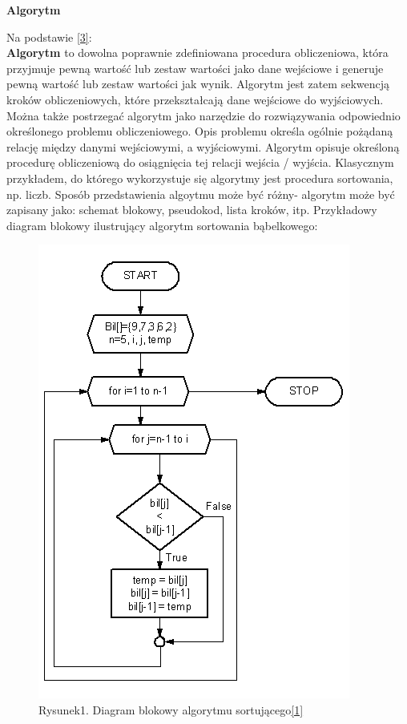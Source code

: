 \documentclass[a4paper, twoside, 12pt, justified]{article}
\begin{document}
	\begin{large}
		\begin{center}
			\textbf{Algorytm}
		\end{center}
	\end{large}

	Na podstawie \hyperlink{algorithm}{[3]}:\\
	\textbf{Algorytm} to dowolna poprawnie zdefiniowana procedura obliczeniowa, która przyjmuje pewną wartość lub zestaw wartości jako dane wejściowe i generuje pewną wartość lub zestaw wartości jak wynik. Algorytm jest zatem sekwencją kroków obliczeniowych, które przekształcają dane wejściowe do wyjściowych.\\
	Można także postrzegać algorytm jako narzędzie do rozwiązywania odpowiednio określonego problemu obliczeniowego. Opis problemu określa ogólnie pożądaną
	relację między danymi wejściowymi, a wyjściowymi. Algorytm opisuje określoną procedurę obliczeniową do osiągnięcia tej relacji wejścia / wyjścia. Klasycznym przykładem, do którego wykorzystuje się algorytmy jest procedura sortowania, np. liczb. Sposób przedstawienia algoytmu może być różny- algorytm może być zapisany jako: schemat blokowy, pseudokod, lista kroków, itp. Przykładowy diagram blokowy ilustrujący algorytm sortowania bąbelkowego:\\
	\begin{figure}[h]
		\includegraphics[scale=0.75]{bubble_sort}
		\centering
		\\
		{Rysunek1. Diagram blokowy algorytmu sortującego\hyperlink{bubble}{[1]}} 
	\end{figure}
	
\end{document}

